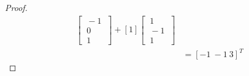 \documentclass[../main.tex]{subfiles}
\begin{document}
\begin{proof}
\begin{align*}
\begin{bmatrix}
                        \ -1 \ \\
                        \ 0  \ \\
                        \ 1  \
                \end{bmatrix} +
                [1]\begin{bmatrix}
                        \ 1  \ \\
                        \ -1 \ \\
                        \ 1  \
                \end{bmatrix}                \\
                 & = [-1 \ -1 \ 3]^T
        \end{align*}
\end{proof}
\end{document}
